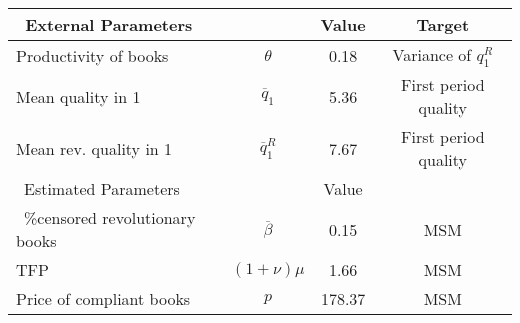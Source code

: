 \begin{table}[H]
  \centering %
  \begin{tabular}{@{} l c c c @{}}  
  \hline\hline %
  \ External Parameters &  & Value & Target  \\ [0.05ex] %
  \hline %
  \rule{0pt}{2.5ex}
  Productivity of books  & $\theta$   & 0.18 & Variance of $q^R_1$  \\[0.15ex]
  Mean quality in 1  & $\overline{q}_1$   & 5.36 & First period quality  \\[0.15ex]
  Mean rev. quality in 1  & $\overline{q}^R_1$   & 7.67 & First period quality \\[0.15ex]
  \hline \hline
  \ Estimated Parameters &  & Value &  \\ [0.05ex] %
  \hline
  \ \%censored revolutionary books  & $\overline{\beta}$   & 0.15 & MSM  \\[0.15ex]
  TFP  & $(1+\nu)\mu$   & 1.66 & MSM  \\[0.15ex]
  Price of compliant books   & $p$   & 178.37 & MSM  \\[0.15ex]
  \hline
  \end{tabular}
  \end{table}
